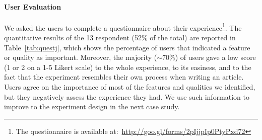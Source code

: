\documentclass{llncs}
\begin{document}
\paragraph{User Evaluation}
We asked the users to complete a questionnaire about their experience\footnote{The questionnaire is available at:~\url{http://goo.gl/forms/2pIjjpIp0PtyPxd72}}. The quantitative results of the 13 respondent (52\% of the total) are reported in Table~\ref{tab:questj}, which shows the percentage of users that indicated a feature or quality as important. Moreover, the majority ($\sim$70\%) of users gave a low score (1 or 2 on a 1-5 Likert scale) to the whole experience, to its easiness, and to the fact that the experiment resembles their own process when writing an article. Users agree on the importance of most of the features and qualities we identified, but they negatively assess the experience they had. We use such information to improve to the experiment design in the next case study.
%
%
%
%
%
%
%
%
%
%
%
%
\end{document}
